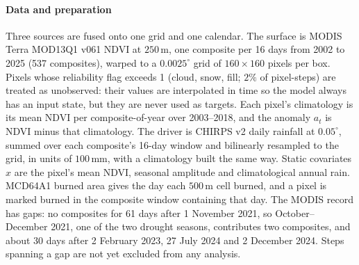 \documentclass{article}
\begin{document}
\paragraph{Data and preparation} Three sources are fused onto one grid and one calendar. The surface is MODIS Terra MOD13Q1 v061 NDVI at $250$\,m, one composite per 16 days from 2002 to 2025 (537 composites), warped to a $0.0025^\circ$ grid of $160\times160$ pixels per box. Pixels whose reliability flag exceeds 1 (cloud, snow, fill; $2\%$ of pixel-steps) are treated as unobserved: their values are interpolated in time so the model always has an input state, but they are never used as targets. Each pixel's climatology is its mean NDVI per composite-of-year over 2003--2018, and the anomaly $a_t$ is NDVI minus that climatology. The driver is CHIRPS v2 daily rainfall at $0.05^\circ$, summed over each composite's 16-day window and bilinearly resampled to the grid, in units of $100$\,mm, with a climatology built the same way. Static covariates $x$ are the pixel's mean NDVI, seasonal amplitude and climatological annual rain. MCD64A1 burned area gives the day each $500$\,m cell burned, and a pixel is marked burned in the composite window containing that day. The MODIS record has gaps: no composites for 61 days after 1 November 2021, so October--December 2021, one of the two drought seasons, contributes two composites, and about 30 days after 2 February 2023, 27 July 2024 and 2 December 2024. Steps spanning a gap are not yet excluded from any analysis.
\end{document}

